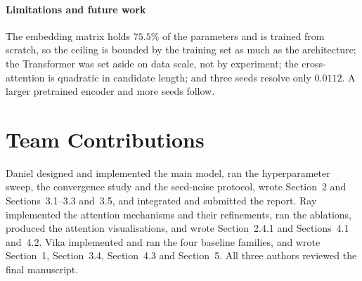 \documentclass[11pt]{article}
\begin{document}
\paragraph{Limitations and future work}
The embedding matrix holds $75.5\%$ of the parameters and is trained from
scratch, so the ceiling is bounded by the training set as much as the
architecture; the Transformer was set aside on data scale, not by experiment;
the cross-attention is quadratic in candidate length; and three seeds resolve
only $0.0112$. A larger pretrained encoder and more seeds follow.

\section*{Team Contributions}

Daniel designed and implemented the main model, ran the hyperparameter sweep,
the convergence study and the seed-noise protocol, wrote Section~2 and
Sections~3.1--3.3 and~3.5, and integrated and submitted the report. Ray
implemented the attention mechanisms and their refinements, ran the
ablations, produced the attention visualisations, and wrote Section~2.4.1 and
Sections~4.1 and~4.2. Vika implemented and ran the four baseline families, and
wrote Section~1, Section~3.4, Section~4.3 and Section~5. All three authors
reviewed the final manuscript.

{\footnotesize}
\end{document}
